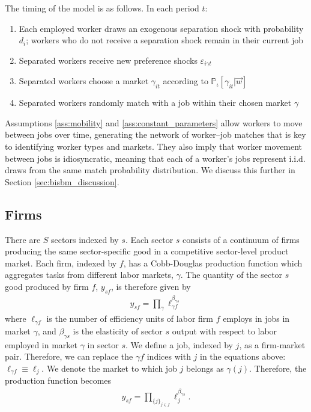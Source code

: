 \documentclass[12pt]{article}
\def\g{\gamma}
\def\i{\iota}
\renewcommand{\P}{\mathbb {P}}
\theoremstyle{definition}
\theoremstyle{plain}
\def\ve{\varepsilon}
\begin{document}
The timing of the model is as follows. In each period $t$:
\begin{enumerate}
	\item Each employed worker draws an exogenous separation shock with probability $d_i$; workers who do not receive a separation shock remain in their current job
	\item Separated workers receive new preference shocks $\ve_{i\g t}$
	\item Separated workers choose a market $\g_{it}$ according to $\P_{\i}[\g_{it} |  \vec{w}]$
	\item Separated workers randomly match with a job within their chosen market $\g$
\end{enumerate}

Assumptions \ref{ass:mobility} and \ref{ass:constant_parameters} allow workers to move between jobs over time, generating the network of worker--job matches that is key to identifying worker types and markets. They also imply that worker movement between jobs is idiosyncratic, meaning that each of a worker's jobs represent i.i.d. draws from the same match probability distribution. We discuss this further in Section \ref{sec:bisbm_discussion}.





\subsection{Firms}
\label{sec:model_firms}


There are $S$ sectors indexed by $s$. Each sector $s$ consists of a continuum of firms producing the same sector-specific good in a competitive sector-level product market. Each firm, indexed by $f$, has a Cobb-Douglas production function which aggregates tasks from different labor markets, $\g$.  The quantity of the sector $s$ good produced by firm $f$, $y_{sf}$, is therefore given by
\begin{align}
	y_{sf} = \prod_{\g} \ell_{\g f}^{\beta_{\g s}}  \label{eq:int_prod}
\end{align}
where $\ell_{\g f}$ is the number of efficiency units of labor firm $f$ employs in jobs in market $\g$, and $\beta_{\g s}$ is the elasticity of sector $s$ output with respect to labor employed in market $\g$ in sector $s$. We define a job, indexed by $j$, as a firm-market pair. Therefore, we can replace the $\g f$ indices with $j$ in the equations above: $\ell_{\g f} \equiv \ell_j$. We denote the market to which job $j$ belongs as $\g(j)$. Therefore, the production function becomes 
\begin{align*}
	y_{sf} = \prod_{\{j\}_{j \in f}} \ell_{j}^{\beta_{\g s}}.
\end{align*}
\end{document}
